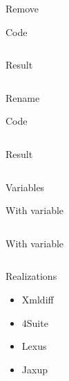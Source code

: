 \documentclass[sans]{beamer}
\begin{document}
\begin{frame}{Remove}
	\begin{block}{Code}
		\inputminted[fontsize=\footnotesize]{xml}{codes/ex18.xml}
	\end{block}
	\begin{block}{Result}
		\inputminted[fontsize=\footnotesize]{xml}{codes/ex19.xml}
	\end{block}		
\end{frame}

\begin{frame}{Rename}
	\begin{block}{Code}
		\inputminted[fontsize=\footnotesize]{xml}{codes/ex20.xml}
	\end{block}
	\begin{block}{Result}
		\inputminted[fontsize=\footnotesize]{xml}{codes/ex21.xml}
	\end{block}		
\end{frame}

\begin{frame}{Variables}
	\begin{block}{With variable}
		\inputminted[fontsize=\tiny]{xml}{codes/ex22.xml}
	\end{block}
	\begin{block}{With variable}
		\inputminted[fontsize=\tiny]{xml}{codes/ex23.xml}
	\end{block}		
\end{frame}

\begin{frame}{Realizations}
	\begin{itemize}
		\item Xmldiff
		\item 4Suite
		\item Lexus
		\item Jaxup
	\end{itemize}
\end{frame}
\end{document}
